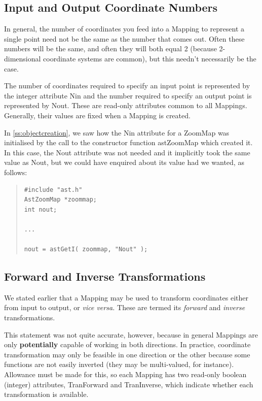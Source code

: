\documentclass[twoside,11pt]{article}
\newcommand{\htmlref}[2]{#1}
\newcommand{\secref}[1]{\S\ref{#1}}
\renewcommand{\secref}[1]{\ref{#1}}
\begin{document}
\subsection{Input and Output Coordinate Numbers}

In general, the number of coordinates you feed into a \htmlref{Mapping}{Mapping} to
represent a single point need not be the same as the number that comes
out. Often these numbers will be the same, and often they will both
equal 2 (because 2-dimensional coordinate systems are common), but
this needn't necessarily be the case.

The number of coordinates required to specify an input point is
represented by the integer attribute \htmlref{Nin}{Nin} and the number required to
specify an output point is represented by \htmlref{Nout}{Nout}. These are read-only
attributes common to all Mappings. Generally, their values are fixed
when a Mapping is created.

In \secref{ss:objectcreation}, we saw how the Nin attribute for a
\htmlref{ZoomMap}{ZoomMap} was initialised by the call to the constructor function
\htmlref{astZoomMap}{astZoomMap} which created it. In this case, the Nout attribute was not
needed and it implicitly took the same value as Nout, but we could
have enquired about its value had we wanted, as follows:

\begin{quote}
\small
\begin{verbatim}
#include "ast.h"
AstZoomMap *zoommap;
int nout;

...

nout = astGetI( zoommap, "Nout" );
\end{verbatim}
\normalsize
\end{quote}

\subsection{Forward and Inverse Transformations}

We stated earlier that a \htmlref{Mapping}{Mapping} may be used to transform coordinates
either from input to output, or {\em{vice versa.}} These are termed
its {\em{forward}} and {\em{inverse}} transformations.

This statement was not quite accurate, however, because in general
Mappings are only {\bf{potentially}} capable of working in both
directions. In practice, coordinate transformation may only be
feasible in one direction or the other because some functions are not
easily inverted (they may be multi-valued, for instance). Allowance
must be made for this, so each Mapping has two read-only boolean
(integer) attributes, \htmlref{TranForward}{TranForward} and \htmlref{TranInverse}{TranInverse}, which indicate
whether each transformation is available.
\end{document}
